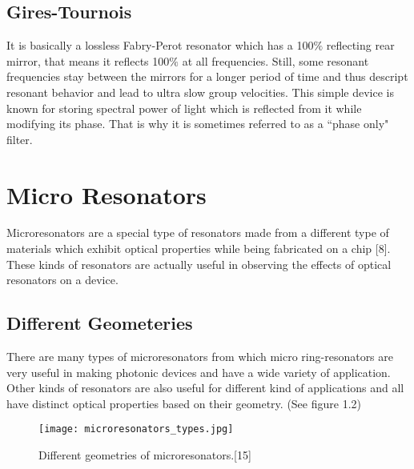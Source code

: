 \subsection{Gires-Tournois}
It is basically a lossless Fabry-Perot resonator which has a 100$\%$ reflecting rear mirror, that means it reflects 100$\%$ at all frequencies. Still, some resonant frequencies stay between the mirrors for a longer period of time and thus descript resonant behavior and lead to ultra slow group velocities. This simple device is known for storing spectral power of light which is reflected from it while modifying its phase. That is why it is sometimes referred to as a “phase only" filter.


\section{Micro Resonators}
Microresonators are a special type of resonators made from a different type of materials which exhibit optical properties while being fabricated on a chip [8]. These kinds of resonators are actually useful in observing the effects of optical resonators on a device.

\subsection{Different Geometeries}
There are many types of microresonators from which micro ring-resonators are very useful in making photonic devices and have a wide variety of application. Other kinds of resonators are also useful for different kind of applications and all have distinct optical properties based on their geometry. (See figure 1.2)
\begin{figure}[h]
\centering
\texttt{[image: microresonators\_types.jpg]}
\caption{Different geometries of microresonators.[15]}
\end{figure}


